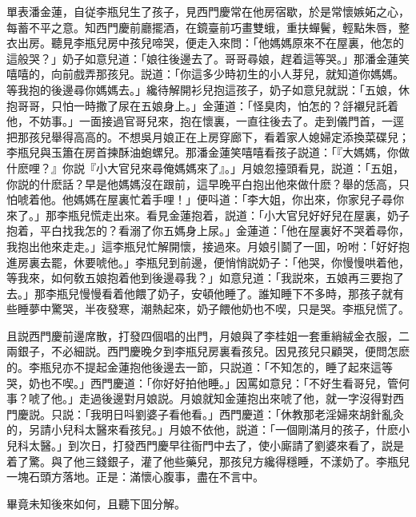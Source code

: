 單表潘金蓮，自従李瓶兒生了孩子，見西門慶常在他房宿歇，於是常懷嫉妬之心，每蓄不平之意。知西門慶前廳擺酒，在鏡臺前巧畫雙蛾，重扶蟬鬢，輕點朱唇，整衣出房。聽見李瓶兒房中孩兒啼哭，便走入來問：「他媽媽原來不在屋裏，他怎的這般哭？」奶子如意兒道：「娘往後邊去了。哥哥尋娘，趕着這等哭。」那潘金蓮笑嘻嘻的，向前戲弄那孩兒。説道：「你這多少時初生的小人芽兒，就知道你媽媽。等我抱的後邊尋你媽媽去。」纔待解開衫兒抱這孩子，奶子如意兒就説：「五娘，休抱哥哥，只怕一時撒了尿在五娘身上。」金蓮道：「怪臭肉，怕怎的？㧱襯兒託着他，不妨事。」一面接過官哥兒來，抱在懷裏，一直往後去了。走到儀門首，一逕把那孩兒舉得高高的。不想吳月娘正在上房穿廊下，看着家人媳婦定添換菜碟兒；李瓶兒與玉簫在房首揀酥油蚫螺兒。那潘金蓮笑嘻嘻看孩子説道：「『大媽媽，你做什麽哩？』你説『小大官兒來尋俺媽媽來了』。」月娘忽擡頭看見，説道：「五姐，你説的什麽話？早是他媽媽沒在跟前，這早晚平白抱出他來做什麽？舉的恁高，只怕唬着他。他媽媽在屋裏忙着手哩！」便呌道：「李大姐，你出來，你家兒子尋你來了。」那李瓶兒慌走出來。看見金蓮抱着，説道：「小大官兒好好兒在屋裏，奶子抱着，平白找我怎的？看溺了你五媽身上尿。」金蓮道：「他在屋裏好不哭着尋你，我抱出他來走走。」這李瓶兒忙解開懷，接過來。月娘引鬬了一囬，吩咐：「好好抱進房裏去罷，休要唬他。」李瓶兒到前邊，便悄悄説奶子：「他哭，你慢慢哄着他，等我來，如何敎五娘抱着他到後邊尋我？」如意兒道：「我説來，五娘再三要抱了去。」那李瓶兒慢慢看着他餵了奶子，安頓他睡了。誰知睡下不多時，那孩子就有些睡夢中驚哭，半夜發寒，潮熱起來，奶子餵他奶也不喫，只是哭。李瓶兒慌了。

且説西門慶前邊席散，打發四個唱的出門，月娘與了李桂姐一套重綃絨金衣服，二兩銀子，不必細説。西門慶晚夕到李瓶兒房裏看孩兒。因見孩兒只顧哭，便問怎麽的。李瓶兒亦不提起金蓮抱他後邊去一節，只説道：「不知怎的，睡了起來這等哭，奶也不喫。」西門慶道：「你好好拍他睡。」因罵如意兒：「不好生看哥兒，管何事？唬了他。」走過後邊對月娘説。月娘就知金蓮抱出來唬了他，就一字沒得對西門慶説。只説：「我明日呌劉婆子看他看。」西門慶道：「休教那老淫婦來胡針亂灸的，另請小兒科太醫來看孩兒。」月娘不依他，説道：「一個剛滿月的孩子，什麽小兒科太醫。」到次日，打發西門慶早往衙門中去了，使小廝請了劉婆來看了，説是着了驚。與了他三錢銀子，灌了他些藥兒，那孩兒方纔得穩睡，不漾奶了。李瓶兒一塊石頭方落地。正是：滿懷心腹事，盡在不言中。

畢竟未知後來如何，且聽下囬分解。

